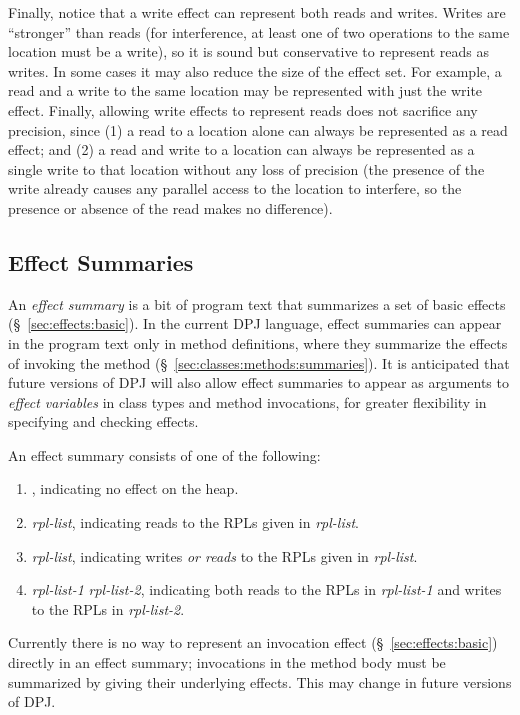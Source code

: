Finally, notice that a write effect can represent both reads and
writes.  Writes are ``stronger'' than reads (for interference, at
least one of two operations to the same location must be a write), so
it is sound but conservative to represent reads as writes.  In some
cases it may also reduce the size of the effect set.  For example, a
read and a write to the same location may be represented with just the
write effect.  Finally, allowing write effects to represent reads does
not sacrifice any precision, since (1) a read to a location alone can
always be represented as a read effect; and (2) a read and write to a
location can always be represented as a single write to that location
without any loss of precision (the presence of the write already
causes any parallel access to the location to interfere, so the
presence or absence of the read makes no difference).

\subsection{Effect Summaries%
\label{sec:effects:summaries}}

An \emph{effect summary} is a bit of program text that summarizes a
set of basic effects (\S~\ref{sec:effects:basic}).  In the current DPJ
language, effect summaries can appear in the program text only in
method definitions, where they summarize the effects of invoking the
method (\S~\ref{sec:classes:methods:summaries}).  It is anticipated
that future versions of DPJ will also allow effect summaries to appear
as arguments to \emph{effect variables} in class types and method
invocations, for greater flexibility in specifying and checking
effects.

An effect summary consists of one of the following:
%
\begin{enumerate}
%
\item {}, indicating no effect on the heap.
%
\item {} \emph{rpl-list}, indicating reads to the RPLs given
  in \emph{rpl-list}.
%
\item {} \emph{rpl-list}, indicating writes \emph{or reads}
  to the RPLs given in \emph{rpl-list}.  
%
\item {} \emph{rpl-list-1}  \emph{rpl-list-2},
  indicating both reads to the RPLs in \emph{rpl-list-1} and writes to
  the RPLs in \emph{rpl-list-2}.
%
\end{enumerate}
%
Currently there is no way to represent an invocation effect
(\S~\ref{sec:effects:basic}) directly in an effect summary;
invocations in the method body must be summarized by giving their
underlying effects.  This may change in future versions of DPJ.

